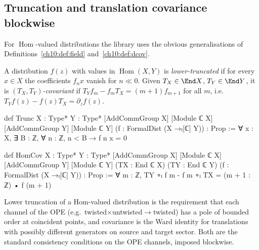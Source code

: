 \subsection{Truncation and translation covariance blockwise}

For $\operatorname{Hom}$-valued distributions the library uses the obvious generalisations of
Definitions~\ref{ch10:def:field} and~\ref{ch10:def:dcov}.

\begin{definition}\label{ch10:def:trunc}
A distribution $f(z)$ with values in $\operatorname{Hom}(X,Y)$ is \emph{lower-truncated} if for
every $x\in X$ the coefficients $f_n x$ vanish for $n\ll0$.  Given $T_X\in\End X$, $T_Y\in\End Y$,
it is \emph{$(T_X,T_Y)$-covariant} if $T_Y f_m-f_mT_X=(m+1)f_{m+1}$ for all $m$, i.e.\
$T_Yf(z)-f(z)T_X=\partial_zf(z)$.
\end{definition}
\begin{leancode}
def Trunc {X : Type*} {Y : Type*} [AddCommGroup X] [Module ℂ X] [AddCommGroup Y] [Module ℂ Y]
    (f : FormalDist (X →ₗ[ℂ] Y)) : Prop :=
  ∀ x : X, ∃ B : ℤ, ∀ n : ℤ, n < B → f n x = 0

def HomCov {X : Type*} {Y : Type*} [AddCommGroup X] [Module ℂ X] [AddCommGroup Y] [Module ℂ Y]
    (TX : End ℂ X) (TY : End ℂ Y) (f : FormalDist (X →ₗ[ℂ] Y)) : Prop :=
  ∀ m : ℤ, TY ∘ₗ f m - f m ∘ₗ TX = (m + 1 : ℤ) • f (m + 1)
\end{leancode}

\begin{physics}
Lower truncation of a Hom-valued distribution is the requirement that each channel of the OPE (e.g.\ twisted$\times$untwisted$\to$twisted) has a pole of bounded order at coincident points, and covariance is the Ward identity for translations with possibly different generators on source and target sector. Both are the standard consistency conditions on the OPE channels, imposed blockwise.
\end{physics}

